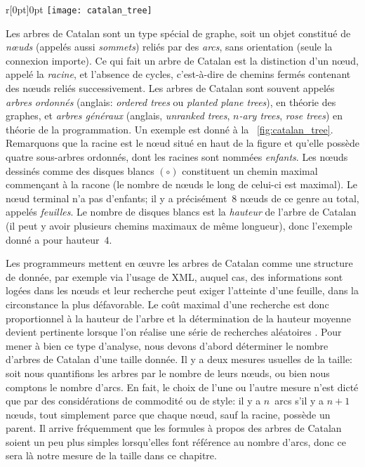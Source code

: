 %
\begin{wrapfigure}[9]{r}[0pt]{0pt}
\centering
\texttt{[image: catalan\_tree]}
\caption{Arbre de Catalan de hauteur~4}
\label{fig:catalan_tree}
\end{wrapfigure}
Les arbres de Catalan sont un type spécial de graphe, soit un objet
constitué de \emph{n{\oe}uds} (appelés aussi \emph{sommets}) reliés
par des \emph{arcs}, sans orientation (seule la connexion importe). Ce
qui fait un arbre de Catalan est la distinction d'un n{\oe}ud, appelé
la \emph{racine}, et l'absence de cycles, c'est-à-dire de chemins
fermés contenant des n{\oe}uds reliés successivement. Les arbres de
Catalan sont souvent appelés \emph{arbres ordonnés} (anglais:
\emph{ordered trees} ou \emph{planted plane trees}), en théorie des
graphes, et \emph{arbres généraux} (anglais, \emph{unranked trees},
\emph{\(n\)-ary trees}, \emph{rose trees}) en théorie de la
programmation. Un exemple est donné à la
\fig~\ref{fig:catalan_tree}. Remarquons que la racine est le n{\oe}ud
situé en haut de la figure et qu'elle possède quatre sous-arbres
ordonnés, dont les racines sont nommées \emph{enfants}. Les n{\oe}uds
dessinés comme des disques blancs \((\circ)\) constituent un chemin
maximal commençant à la racone (le nombre de n{\oe}uds le long de
celui-ci est maximal). Le n{\oe}ud terminal n'a pas d'enfants; il y a
précisément~\(8\) n{\oe}uds de ce genre au total, appelés
\emph{feuilles}. Le nombre de disques blancs est la \emph{hauteur} de
l'arbre de Catalan (il peut y avoir plusieurs chemins maximaux de même
longueur), donc l'exemple donné a pour hauteur~\(4\).

Les programmeurs mettent en {\oe}uvre les arbres de Catalan comme une
structure de donnée, par exemple via l'usage de \textsf{XML}, auquel
cas, des informations sont logées dans les n{\oe}uds et leur recherche
peut exiger l'atteinte d'une feuille, dans la circonstance la plus
défavorable. Le coût maximal d'une recherche est donc proportionnel à
la hauteur de l'arbre et la détermination de la hauteur moyenne
devient pertinente lorsque l'on réalise une série de recherches
aléatoires \citep{VitterFlajolet_1990}. Pour mener à bien ce type
d'analyse, nous devons d'abord déterminer le nombre d'arbres de
Catalan d'une taille donnée. Il y a deux mesures usuelles de la
taille: soit nous quantifions les arbres par le nombre de leurs
n{\oe}uds, ou bien nous comptons le nombre d'arcs. En fait, le choix
de l'une ou l'autre mesure n'est dicté que par des considérations de commodité ou de style: il y a \(n\)~arcs s'il y a \(n+1\) n{\oe}uds, tout simplement parce que chaque n{\oe}ud, sauf la racine, possède un parent. Il arrive fréquemment que les formules à propos des arbres de Catalan soient un peu plus simples lorsqu'elles font référence au nombre d'arcs, donc ce sera là notre mesure de la taille dans ce chapitre.

